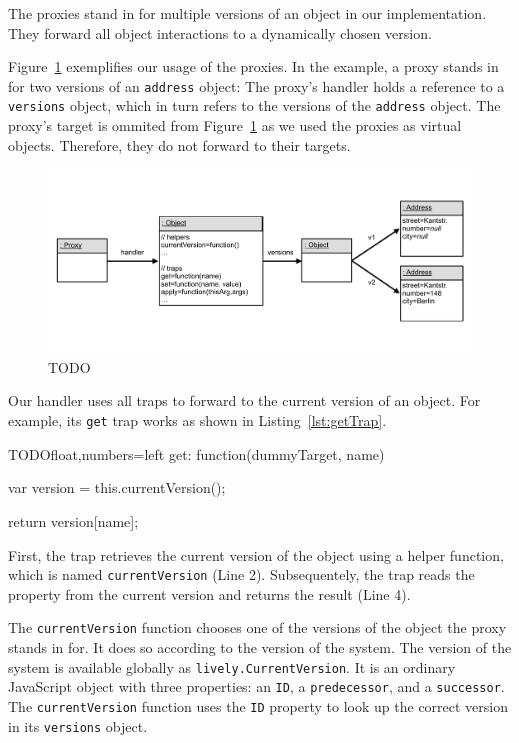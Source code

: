 The proxies stand in for multiple versions of an object in our implementation.
They forward all object interactions to a dynamically chosen version.

Figure~\ref{fig:VersioningProxy} exemplifies our usage of the proxies.
In the example, a proxy stands in for two versions of an \lstinline{address} object: The proxy's handler holds a reference to a \lstinline{versions} object, which in turn refers to the versions of the \lstinline{address} object.
The proxy's target is ommited from Figure~\ref{fig:VersioningProxy} as we used the proxies as virtual objects.
Therefore, they do not forward to their targets.

\begin{figure}[h]
    \centering
    \includegraphics[width=\textwidth]{figures/5_implementation/2_versioningProxy.pdf}
    \caption{TODO}
    \label{fig:VersioningProxy}
\end{figure}

Our handler uses all traps to forward to the current version of an object.
For example, its \lstinline{get} trap works as shown in Listing~\ref{lst:getTrap}.

\begin{code}{TODO}{float,numbers=left}
get: function(dummyTarget, name) {
    var version = this.currentVersion();
    
    return version[name];
}
\end{code}
\iffalse
\end{verbatim}\fi

First, the trap retrieves the current version of the object using a helper function, which is named \lstinline{currentVersion} (Line 2).
Subsequentely, the trap reads the property from the current version and returns the result (Line 4).

The \lstinline{currentVersion} function chooses one of the versions of the object the proxy stands in for.
It does so according to the version of the system.
The version of the system is available globally as \lstinline{lively.CurrentVersion}.
It is an ordinary JavaScript object with three properties: an \lstinline{ID}, a \lstinline{predecessor}, and a \lstinline{successor}.
The \lstinline{currentVersion} function uses the \lstinline{ID} property to look up the correct version in its \lstinline{versions} object.

